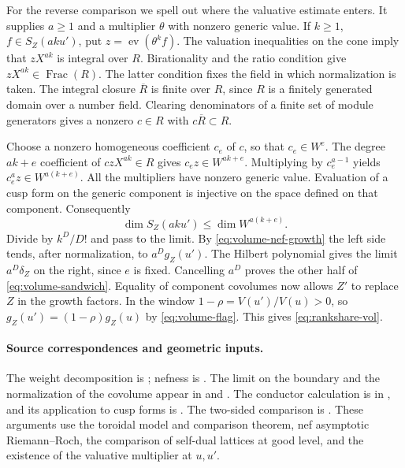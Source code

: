 For the reverse comparison we spell out where the valuative estimate
enters. It supplies \(a\ge1\) and a multiplier \(\theta\) with nonzero
generic value. If \(k\ge1\), \(f\in S_Z(ak u')\), put
\(z=\operatorname{ev}(\theta^k f)\). The valuation inequalities on the
cone imply that \(zX^{ak}\) is integral over \(R\). Birationality and
the ratio condition give \(zX^{ak}\in\operatorname{Frac}(R)\). The latter
condition fixes the field in which normalization is taken. The integral
closure \(\overline R\) is finite over \(R\), since \(R\) is a finitely
generated domain over a number field. Clearing denominators of a finite
set of module generators gives a nonzero \(c\in R\) with
\(c\overline R\subset R\).

Choose a nonzero homogeneous coefficient \(c_e\) of \(c\), so that
\(c_e\in W^e\). The degree \(ak+e\) coefficient of \(czX^{ak}\in R\)
gives \(c_ez\in W^{ak+e}\). Multiplying by \(c_e^{a-1}\) yields
\(c_e^az\in W^{a(k+e)}\). All the multipliers have nonzero generic
value. Evaluation of a cusp form on the generic component is injective
on the space defined on that component. Consequently
\[
 \dim S_Z(ak u')\le \dim W^{a(k+e)} .
\]
Divide by \(k^D/D!\) and pass to the limit. By
\eqref{eq:volume-nef-growth} the left side tends, after normalization,
to \(a^Dg_Z(u')\). The Hilbert polynomial gives the limit
\(a^D\delta_Z\) on the right, since \(e\) is fixed. Cancelling \(a^D\)
proves the other half of \eqref{eq:volume-sandwich}. Equality of
component covolumes now allows \(Z'\) to replace \(Z\) in the growth
factors. In the window \(1-\rho=V(u')/V(u)>0\), so
\(g_Z(u')=(1-\rho)g_Z(u)\) by \eqref{eq:volume-flag}. This gives
\eqref{eq:rankshare-vol}.

\paragraph{Source correspondences and geometric inputs.}
The weight decomposition is ; nefness is
. The limit on the boundary and the
normalization of the covolume appear in 
and . The conductor calculation is in
, and its application to cusp
forms is . The two-sided
comparison is .
These arguments use the toroidal model and comparison theorem, nef
asymptotic Riemann--Roch, the comparison of self-dual lattices at good
level, and the existence of the valuative multiplier at \(u,u'\).
